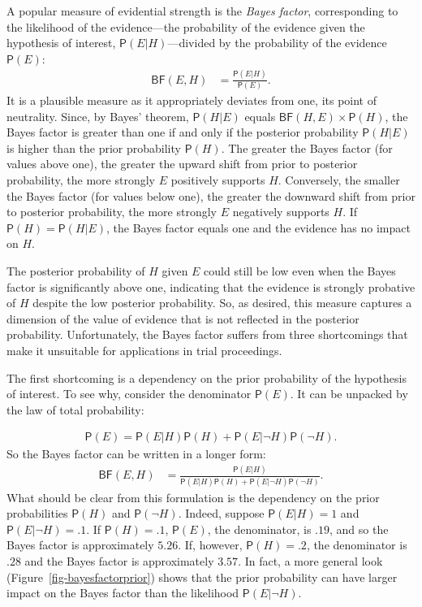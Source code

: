 \documentclass[
  letterpaper,
  DIV=11,
  numbers=noendperiod]{scrartcl}
\newcommand{\n}{\neg}
\newcommand{\pr}[1]{\mathsf{P}(#1)}
\begin{document}
A popular measure of evidential strength is the \emph{Bayes factor},
corresponding to the likelihood of the evidence---the probability of the
evidence given the hypothesis of interest, \(\pr{E \vert H}\)---divided
by the probability of the evidence \(\pr{E}\): \begin{align*} 
\mathsf{BF}(E,H) & = \frac{\pr{E \vert H}}{\pr{E}}.
\end{align*} \noindent It is a plausible measure as it appropriately
deviates from one, its point of neutrality. Since, by Bayes' theorem,
\(\pr{H \vert E}\) equals \(\mathsf{BF}(H, E) \times \pr{H}\), the Bayes
factor is greater than one if and only if the posterior probability
\(\pr{H \vert E}\) is higher than the prior probability \(\pr{H}\). The
greater the Bayes factor (for values above one), the greater the upward
shift from prior to posterior probability, the more strongly \(E\)
positively supports \(H\). Conversely, the smaller the Bayes factor (for
values below one), the greater the downward shift from prior to
posterior probability, the more strongly \(E\) negatively supports
\(H\). If \(\pr{H}=\pr{H\vert E}\), the Bayes factor equals one and the
evidence has no impact on \(H\).

The posterior probability of \(H\) given \(E\) could still be low even
when the Bayes factor is significantly above one, indicating that the
evidence is strongly probative of \(H\) despite the low posterior
probability. So, as desired, this measure captures a dimension of the
value of evidence that is not reflected in the posterior probability.
Unfortunately, the Bayes factor suffers from three shortcomings that
make it unsuitable for applications in trial proceedings.

The first shortcoming is a dependency on the prior probability of the
hypothesis of interest. To see why, consider the denominator \(\pr{E}\).
It can be unpacked by the law of total probability:

\vspace{-3mm}

\begin{align} \label{eq:lotpSimple}
\pr{E}= \pr{E \vert H} \pr{H}+\pr{E \vert \neg H} \pr{\neg H}.
\end{align} \noindent  So the Bayes factor can be written in a longer
form: \begin{align}\label{eq:BFlotp}
\mathsf{BF}(E,H) & = \frac{\pr{E \vert H}}{\pr{E \vert H} \pr{H}+\pr{E \vert \neg H} \pr{\neg H}}.
\end{align} \noindent What should be clear from this formulation is the
dependency on the prior probabilities \(\pr{H}\) and \(\pr{\neg H}\).
Indeed, suppose \(\pr{E \vert H} = 1\) and \(\pr{E \vert \neg H} = .1\).
If \(\pr{H}=.1\), \(\pr{E}\), the denominator, is \(.19\), and so the
Bayes factor is approximately \(5.26\). If, however, \(\pr{H} =.2\), the
denominator is \(.28\) and the Bayes factor is approximately \(3.57\).
In fact, a more general look (Figure~\ref{fig-bayesfactorprior}) shows
that the prior probability can have larger impact on the Bayes factor
than the likelihood \(\pr{E \vert \n H}\).
\end{document}
